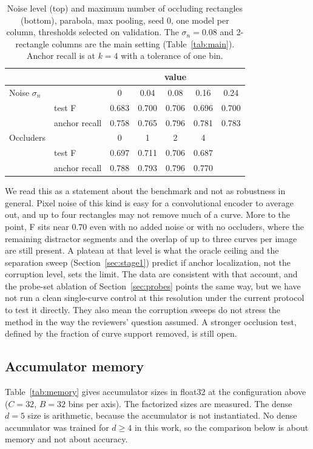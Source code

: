 \documentclass[11pt]{article}
\begin{document}
\begin{table}[t]
\centering
\caption{Noise level (top) and maximum number of occluding rectangles (bottom), parabola, max pooling, seed 0, one model per column, thresholds selected on validation. The $\sigma_n=0.08$ and 2-rectangle columns are the main setting (Table~\ref{tab:main}). Anchor recall is at $k=4$ with a tolerance of one bin.}
\label{tab:noise}
\small
\begin{tabular}{llccccc}
\toprule
 & & \multicolumn{5}{c}{\textbf{value}} \\
\midrule
Noise $\sigma_n$ & & 0 & 0.04 & 0.08 & 0.16 & 0.24 \\
 & test F & 0.683 & 0.700 & 0.706 & 0.696 & 0.700 \\
 & anchor recall & 0.758 & 0.765 & 0.796 & 0.781 & 0.783 \\
\addlinespace
Occluders & & 0 & 1 & 2 & 4 & \\
 & test F & 0.697 & 0.711 & 0.706 & 0.687 & \\
 & anchor recall & 0.788 & 0.793 & 0.796 & 0.770 & \\
\bottomrule
\end{tabular}
\end{table}

We read this as a statement about the benchmark and not as robustness in general. Pixel noise of this kind is easy for a convolutional encoder to average out, and up to four rectangles may not remove much of a curve. More to the point, F sits near 0.70 even with no added noise or with no occluders, where the remaining distractor segments and the overlap of up to three curves per image are still present. A plateau at that level is what the oracle ceiling and the separation sweep (Section~\ref{sec:stage1}) predict if anchor localization, not the corruption level, sets the limit. The data are consistent with that account, and the probe-set ablation of Section~\ref{sec:probes} points the same way, but we have not run a clean single-curve control at this resolution under the current protocol to test it directly. They also mean the corruption sweeps do not stress the method in the way the reviewers' question assumed. A stronger occlusion test, defined by the fraction of curve support removed, is still open.

\subsection{Accumulator memory}
\label{sec:memory}
Table~\ref{tab:memory} gives accumulator sizes in float32 at the configuration above ($C=32$, $B=32$ bins per axis). The factorized sizes are measured. The dense $d=5$ size is arithmetic, because the accumulator is not instantiated. No dense accumulator was trained for $d\ge4$ in this work, so the comparison below is about memory and not about accuracy.
\end{document}
